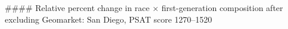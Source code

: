 #### Relative percent change in race × first-generation composition after excluding Geomarket: San Diego, PSAT score 1270–1520
